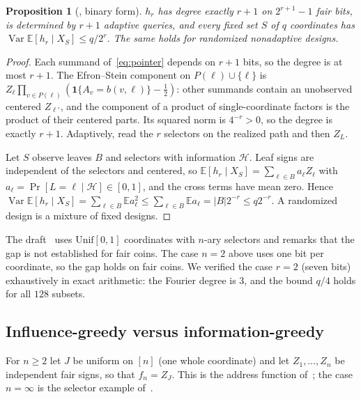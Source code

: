 \documentclass[11pt]{article}
\numberwithin{equation}{section}
\newtheorem{proposition}[theorem]{Proposition}
\theoremstyle{definition}
\theoremstyle{remark}
\newcommand{\E}{\mathbb{E}}
\newcommand{\1}{\mathbf 1}
\newcommand{\Var}{\operatorname{Var}}
\begin{document}
\begin{proposition}[{\cite{WriAO}}, binary form]\label{prop:pointer}
$h_r$ has degree exactly $r+1$ on $2^{r+1}-1$ fair bits, is determined by $r+1$ adaptive queries, and every fixed set $S$ of $q$ coordinates has $\Var\E[h_r\mid X_S]\le q/2^r$. The same holds for randomized nonadaptive designs.
\end{proposition}
\begin{proof}
Each summand of~\eqref{eq:pointer} depends on $r+1$ bits, so the degree is at most $r+1$. The Efron--Stein component on $P(\ell)\cup\{\ell\}$ is $Z_\ell\prod_{v\in P(\ell)}(\1\{A_v=b(v,\ell)\}-\frac12)$: other summands contain an unobserved centered $Z_{\ell'}$, and the component of a product of single-coordinate factors is the product of their centered parts. Its squared norm is $4^{-r}>0$, so the degree is exactly $r+1$. Adaptively, read the $r$ selectors on the realized path and then $Z_L$.

Let $S$ observe leaves $B$ and selectors with information $\mathcal H$. Leaf signs are independent of the selectors and centered, so $\E[h_r\mid X_S]=\sum_{\ell\in B}a_\ell Z_\ell$ with $a_\ell=\Pr[L=\ell\mid\mathcal H]\in[0,1]$, and the cross terms have mean zero. Hence $\Var\E[h_r\mid X_S]=\sum_{\ell\in B}\E a_\ell^2\le\sum_{\ell\in B}\E a_\ell=|B|2^{-r}\le q2^{-r}$. A randomized design is a mixture of fixed designs.
\end{proof}

The draft~\cite{WriAO} uses $\mathrm{Unif}[0,1]$ coordinates with $n$-ary selectors and remarks that the gap is not established for fair coins. The case $n=2$ above uses one bit per coordinate, so the gap holds on fair coins. We verified the case $r=2$ (seven bits) exhaustively in exact arithmetic: the Fourier degree is $3$, and the bound $q/4$ holds for all $128$ subsets.

\subsection{Influence-greedy versus information-greedy}
For $n\ge2$ let $J$ be uniform on $[n]$ (one whole coordinate) and let $Z_1,\dots,Z_n$ be independent fair signs, so that $f_n=Z_J$. This is the address function of~\cite{WriAO}; the case $n=\infty$ is the selector example of~\cite{Wri26}.
\end{document}
